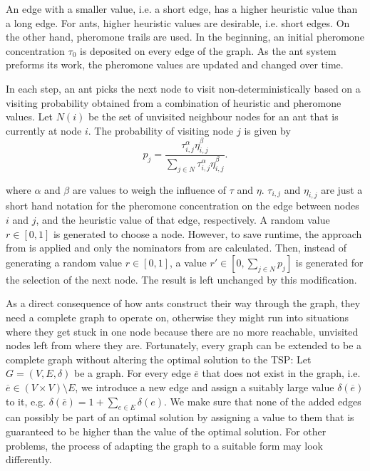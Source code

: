 \vspace*{-0.5em}
An edge with a smaller value, i.e. a short edge, has a higher heuristic value than a long edge. For ants, higher heuristic values are desirable, i.e. short edges. On the other hand, pheromone trails are used. In the beginning, an initial pheromone concentration $\tau_0$ is deposited on every edge of the graph. As the ant system preforms its work, the pheromone values are updated and changed over time.


In each step, an ant picks the next node to visit non-deterministically based on a visiting probability obtained from a combination of heuristic and pheromone values. Let $N \left( i \right)$ be the set of unvisited neighbour nodes for an ant that is currently at node $i$. The probability of visiting node $j$ is given by
\vspace*{-0.5em}
\begin{equation}
  \label{eqn:probability}
  p_j = \frac{\tau_{i,j}^\alpha \eta_{i,j}^\beta}{\sum_{j \in N} \tau_{i,j}^\alpha \eta_{i,j}^\beta}.
\end{equation}

\vspace*{-0.5em}
where $\alpha$ and $\beta$ are values to weigh the influence of $\tau$ and $\eta$. $\tau_{i,j}$ and $\eta_{i,j}$ are just a short hand notation for the pheromone concentration on the edge between nodes $i$ and $j$, and the heuristic value of that edge, respectively. A random value $r \in \left[0, 1 \right]$ is generated to choose a node. However, to save runtime, the approach from \cite{Bloecker} is applied and only the nominators from  are calculated. Then, instead of generating a random value $r \in \left[0, 1 \right]$, a value $r' \in \left[0, \sum_{j \in N} p_j \right]$ is generated for the selection of the next node. The result is left unchanged by this modification.

As a direct consequence of how ants construct their way through the graph, they need a complete graph to operate on, otherwise they might run into situations where they get stuck in one node because there are no more reachable, unvisited nodes left from where they are. Fortunately, every graph can be extended to be a complete graph without altering the optimal solution to the \textsc{TSP}: Let $G = \left( V, E, \delta \right)$ be a graph. For every edge $\overline{e}$ that does not exist in the graph, i.e. $\overline{e} \in \left( V \times V \right) \setminus E$, we introduce a new edge and assign a suitably large value $\delta \left( \overline{e} \right)$ to it, e.g. $\delta \left( \overline{e} \right) = 1 + \sum_{e \in E} \delta \left( e \right)$. We make sure that none of the added edges can possibly be part of an optimal solution by assigning a value to them that is guaranteed to be higher than the value of the optimal solution. For other problems, the process of adapting the graph to a suitable form may look differently.

